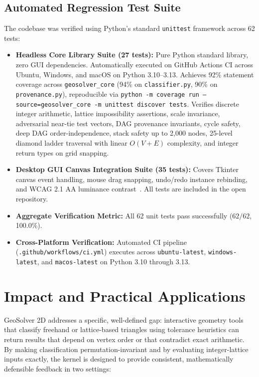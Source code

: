 \documentclass[preprint,12pt]{elsarticle}
\begin{document}
\subsection{Automated Regression Test Suite}
The codebase was verified using Python's standard \texttt{unittest} framework across 62 tests:
\begin{itemize}
\item \textbf{Headless Core Library Suite (27 tests):} Pure Python standard library, zero GUI dependencies. Automatically executed on GitHub Actions CI across Ubuntu, Windows, and macOS on Python 3.10--3.13. Achieves 92\% statement coverage across \texttt{geosolver\_core} (94\% on \texttt{classifier.py}, 90\% on \texttt{provenance.py}), reproducible via \texttt{python -m coverage run --source=geosolver\_core -m unittest discover tests}. Verifies discrete integer arithmetic, lattice impossibility assertions, scale invariance, adversarial near-tie test vectors, DAG provenance invariants, cycle safety, deep DAG order-independence, stack safety up to 2,000 nodes, 25-level diamond ladder traversal with linear $O(V+E)$ complexity, and integer return types on grid snapping.
\item \textbf{Desktop GUI Canvas Integration Suite (35 tests):} Covers Tkinter canvas event handling, mouse drag snapping, undo/redo instance rebinding, and WCAG 2.1 AA luminance contrast~\cite{wcag21}. All tests are included in the open repository.
\item \textbf{Aggregate Verification Metric:} All 62 unit tests pass successfully ($62 / 62$, 100.0\%).
\item \textbf{Cross-Platform Verification:} Automated CI pipeline (\texttt{.github/workflows/ci.yml}) executes across \texttt{ubuntu-latest}, \texttt{windows-latest}, and \texttt{macos-latest} on Python 3.10 through 3.13.
\end{itemize}

\section{Impact and Practical Applications}

GeoSolver 2D addresses a specific, well-defined gap: interactive geometry tools that classify freehand or lattice-based triangles using tolerance heuristics can return results that depend on vertex order or that contradict exact arithmetic. By making classification permutation-invariant and by evaluating integer-lattice inputs exactly, the kernel is designed to provide consistent, mathematically defensible feedback in two settings:
\end{document}
